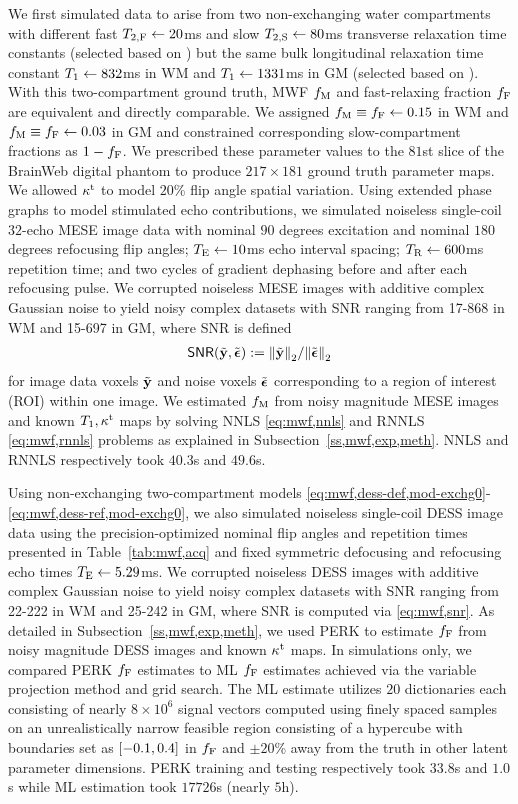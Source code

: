 We first simulated data 
to arise from two non-exchanging water compartments
with different fast $T_{2,\mathrm{F}} \gets 20$ms
and slow $T_{2,\mathrm{S}} \gets 80$ms
transverse relaxation time constants
(selected based on \cite{mackay:94:ivv,deoni:11:com})
but the same bulk longitudinal relaxation time constant
$T_1 \gets 832$ms in WM
and $T_1 \gets 1331$ms in GM
(selected based on \cite{wansapura:99:nrt}).
With this two-compartment ground truth, 
MWF $f_\mathrm{M}$ and fast-relaxing fraction $f_{\mathrm{F}}$
are equivalent and directly comparable.
We assigned 
$f_\mathrm{M} \equiv f_{\mathrm{F}} \gets 0.15$ in WM
and 
$f_\mathrm{M} \equiv f_{\mathrm{F}} \gets 0.03$ in GM
and constrained corresponding slow-compartment fractions
as $1-f_{\mathrm{F}}$.
We prescribed these parameter values
to the $81$st slice
of the BrainWeb digital phantom \cite{collins:98:dac}
to produce $217 \times 181$ ground truth parameter maps.
We allowed $\kappa^{\mathrm{t}}$ to model $20$\% flip angle spatial variation.
Using extended phase graphs 
to model stimulated echo contributions,
we simulated noiseless single-coil $32$-echo MESE image data
with nominal $90$ degrees excitation 
and nominal $180$ degrees refocusing flip angles;
$T_\mathrm{E} \gets 10$ms echo interval spacing; 
$T_\mathrm{R} \gets 600$ms repetition time;
and two cycles of gradient dephasing 
before and after each refocusing pulse.
We corrupted noiseless MESE images
with additive complex Gaussian noise
to yield noisy complex datasets
with SNR ranging 
from 17-868 in WM
and 15-697 in GM,
where SNR is defined
\begin{align}
	\snr{\bmyt,\bmepst} := \norm{\bmyt}_2/\norm{\bmepst}_2
  \label{eq:mwf,snr}
\end{align}
for image data voxels $\tilde{\mathbf{y}}$ and noise voxels $\tilde{\boldsymbol{\epsilon}}$
corresponding to a region of interest (ROI)
within one image.
We estimated $f_\mathrm{M}$ 
from noisy magnitude MESE images
and known $T_1,\kappa^{\mathrm{t}}$ maps
by solving NNLS \eqref{eq:mwf,nnls}
and RNNLS \eqref{eq:mwf,rnnls} problems
as explained in Subsection~\ref{ss,mwf,exp,meth}.
NNLS and RNNLS respectively took $40.3$s and $49.6$s.

Using non-exchanging two-compartment models 
\eqref{eq:mwf,dess-def,mod-exchg0}-\eqref{eq:mwf,dess-ref,mod-exchg0},
we also simulated noiseless single-coil DESS image data
using the precision-optimized nominal flip angles and repetition times
presented in Table~\ref{tab:mwf,acq}
and fixed symmetric defocusing and refocusing echo times $T_\mathrm{E} \gets 5.29$ms.
We corrupted noiseless DESS images
with additive complex Gaussian noise
to yield noisy complex datasets
with SNR ranging
from 22-222 in WM 
and 25-242 in GM,
where SNR is computed via \eqref{eq:mwf,snr}.
As detailed in Subsection~\ref{ss,mwf,exp,meth},
we used PERK to estimate $f_{\mathrm{F}}$
from noisy magnitude DESS images
and known $\kappa^{\mathrm{t}}$ maps.
In simulations only,
we compared PERK $f_{\mathrm{F}}$ estimates
to ML $f_{\mathrm{F}}$ estimates
achieved via the variable projection method \cite{golub:03:snl}
and grid search.
The ML estimate utilizes $20$ dictionaries 
each consisting of nearly $8 \times 10^6$ signal vectors
computed using finely spaced samples
on an unrealistically narrow feasible region
consisting of a hypercube
with boundaries set 
as $\brac{-0.1,0.4}$ in $f_{\mathrm{F}}$ 
and $\pm 20$\% away from the truth
in other latent parameter dimensions.
PERK training and testing respectively took $33.8$s and $1.0$s
while ML estimation took $17726$s (nearly $5$h).

